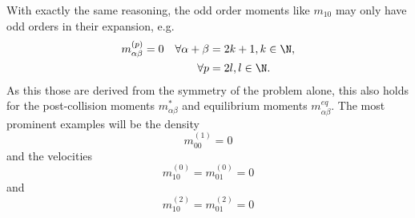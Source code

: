 With exactly the same reasoning, the odd order moments like $m_{10}$ may only have odd orders in their expansion, e.g.
\begin{equation}
  \label{eq: kill odd moments even order}
  \begin{aligned}
    m_{\alpha\beta}^{(p)} = 0 \quad
    \forall\alpha+\beta & = 2k+1, k\in\N, \\
    \forall p & = 2l, l\in\N.
  \end{aligned}
\end{equation}
As this those are derived from the symmetry of the problem alone, this also holds for the post-collision moments $m_{\alpha\beta}^*$ and equilibrium moments $m_{\alpha\beta}^{eq}$.
The most prominent examples will be the density
\begin{equation}
  \label{eq: first order pressure zero}
  m_{00}^{(1)}=0
\end{equation}
and the velocities
\begin{equation}
  \label{eq: zeroth order velocity zero}
  m_{10}^{(0)} = m_{01}^{(0)} = 0
\end{equation}
and
\begin{equation}
  \label{eq: second order velocity zero}
  m_{10}^{(2)} = m_{01}^{(2)} = 0
\end{equation}
